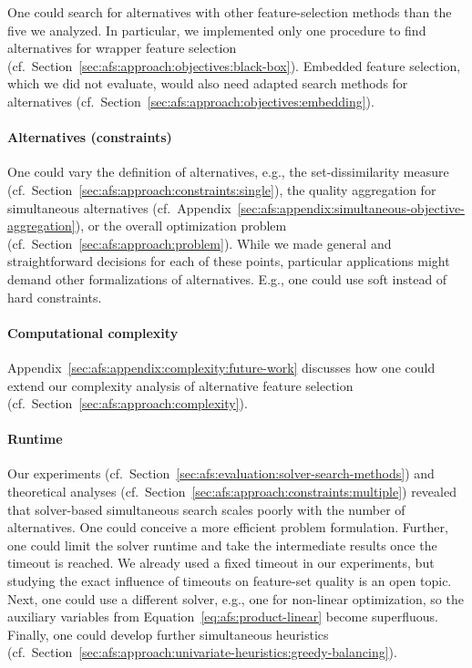 \documentclass{article}
\theoremstyle{definition}
\begin{document}
One could search for alternatives with other feature-selection methods than the five we analyzed.
In particular, we implemented only one procedure to find alternatives for wrapper feature selection (cf.~Section~\ref{sec:afs:approach:objectives:black-box}).
Embedded feature selection, which we did not evaluate, would also need adapted search methods for alternatives (cf.~Section~\ref{sec:afs:approach:objectives:embedding}).

\paragraph{Alternatives (constraints)}

One could vary the definition of alternatives, e.g., the set-dissimilarity measure (cf.~Section~\ref{sec:afs:approach:constraints:single}), the quality aggregation for simultaneous alternatives (cf.~Appendix~\ref{sec:afs:appendix:simultaneous-objective-aggregation}), or the overall optimization problem (cf.~Section~\ref{sec:afs:approach:problem}).
While we made general and straightforward decisions for each of these points, particular applications might demand other formalizations of alternatives.
E.g., one could use soft instead of hard constraints.

\paragraph{Computational complexity} Appendix~\ref{sec:afs:appendix:complexity:future-work} discusses how one could extend our complexity analysis of alternative feature selection (cf.~Section~\ref{sec:afs:approach:complexity}).

\paragraph{Runtime}

Our experiments (cf.~Section~\ref{sec:afs:evaluation:solver-search-methods}) and theoretical analyses (cf.~Section~\ref{sec:afs:approach:constraints:multiple}) revealed that solver-based simultaneous search scales poorly with the number of alternatives.
One could conceive a more efficient problem formulation.
Further, one could limit the solver runtime and take the intermediate results once the timeout is reached.
We already used a fixed timeout in our experiments, but studying the exact influence of timeouts on feature-set quality is an open topic.
Next, one could use a different solver, e.g., one for non-linear optimization, so the auxiliary variables from Equation~\ref{eq:afs:product-linear} become superfluous.
Finally, one could develop further simultaneous heuristics (cf.~Section~\ref{sec:afs:approach:univariate-heuristics:greedy-balancing}).
\end{document}
